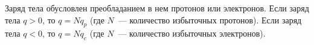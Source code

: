 \documentclass[main.tex]{subfiles}
\begin{document}
\begin{NoHyper}
Заряд тела обусловлен преобладанием в нем протонов или электронов. Если заряд тела $q>0$, то $q=Nq_p$ (где $N$~--- количество избыточных протонов). Если заряд тела $q<0$, то $q=Nq_e$ (где $N$~--- количество избыточных электронов).























\end{NoHyper}
\end{document}

